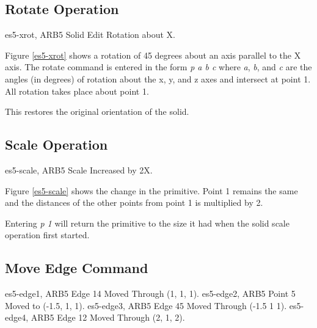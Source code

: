 \subsection{Rotate Operation}
\mfig es5-xrot, ARB5 Solid Edit Rotation about X.


Figure \ref{es5-xrot} shows a rotation of 45 degrees
about an axis parallel to the X axis.
The rotate command is entered in the form {\em p a b c}
where {\em a}, {\em b}, and {\em c} are the angles
(in degrees) of rotation about the x, y, and z axes and intersect at point 1.
All rotation takes place about point 1.


This restores the original orientation of the solid.

\subsection{Scale Operation}
\mfig es5-scale, ARB5 Scale Increased by 2X.


Figure \ref{es5-scale} shows the change in the primitive.
Point 1 remains the same
and the distances of the other points from point 1 is multiplied by 2.

Entering {\em p 1} will return the primitive
to the size it had when the solid scale operation first started.


\subsection{Move Edge Command}
\mfig es5-edge1, ARB5 Edge 14 Moved Through (1, 1, 1).
\mfig es5-edge2, ARB5 Point 5 Moved to (-1.5, 1, 1).
\mfig es5-edge3, ARB5 Edge 45 Moved Through (-1.5 1 1).
\mfig es5-edge4, ARB5 Edge 12 Moved Through (2, 1, 2).


